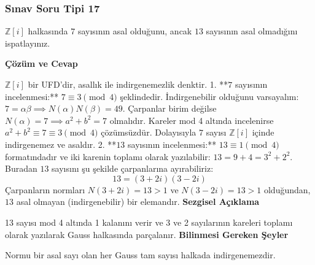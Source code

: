\documentclass[11pt, a4paper]{article}
\newenvironment{cozum}{
    \vspace{0.5cm}
    \noindent\textcolor{green!60!black}{\faCheckCircle\enspace \textbf{\Large Çözüm ve Cevap}}\par\vspace{0.2cm}
}{}
\newenvironment{sezgisel}{
    \vspace{0.5cm}
    \noindent\textcolor{orange!80!black}{\faLightbulb\enspace \textbf{\Large Sezgisel Açıklama}}\par\vspace{0.2cm}
    \itshape
}{}
\newenvironment{bilgi}{
    \vspace{0.5cm}
    \noindent\textcolor{red!70!black}{\faExclamationTriangle\enspace \textbf{\Large Bilinmesi Gereken Şeyler}}\par\vspace{0.2cm}
}{}
\begin{document}
\subsubsection{Sınav Soru Tipi 17}
\begin{sinavbox}
$\mathbb{Z}[i]$ halkasında $7$ sayısının asal olduğunu, ancak $13$ sayısının asal olmadığını ispatlayınız.
\end{sinavbox}
\begin{cozum}
$\mathbb{Z}[i]$ bir UFD'dir, asallık ile indirgenemezlik denktir.
1. **$7$ sayısının incelenmesi:**
   $7 \equiv 3 \pmod 4$ şeklindedir. İndirgenebilir olduğunu varsayalım: $7 = \alpha\beta \implies N(\alpha)N(\beta) = 49$.
   Çarpanlar birim değilse $N(\alpha) = 7 \implies a^2+b^2 = 7$ olmalıdır.
   Kareler mod 4 altında incelenirse $a^2+b^2 \equiv 7 \equiv 3 \pmod 4$ çözümsüzdür.
   Dolayısıyla $7$ sayısı $\mathbb{Z}[i]$ içinde indirgenemez ve asaldır.
2. **$13$ sayısının incelenmesi:**
   $13 \equiv 1 \pmod 4$ formatındadır ve iki karenin toplamı olarak yazılabilir: $13 = 9+4 = 3^2+2^2$.
   Buradan $13$ sayısını şu şekilde çarpanlarına ayırabiliriz:
   \[ 13 = (3+2i)(3-2i) \]
   Çarpanların normları $N(3+2i) = 13 > 1$ ve $N(3-2i) = 13 > 1$ olduğundan, $13$ asal olmayan (indirgenebilir) bir elemandır.
\end{cozum}
\begin{sezgisel}
13 sayısı mod 4 altında 1 kalanını verir ve 3 ve 2 sayılarının kareleri toplamı olarak yazılarak Gauss halkasında parçalanır.
\end{sezgisel}
\begin{bilgi}
Normu bir asal sayı olan her Gauss tam sayısı halkada indirgenemezdir.
\end{bilgi}

\newpage
\end{document}

